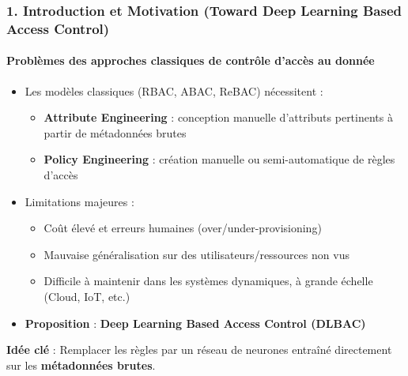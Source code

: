 \documentclass{beamer}
\begin{document}
\begin{frame}
\frametitle{1. Introduction et Motivation (Toward Deep Learning Based Access Control)}
\framesubtitle{Problèmes des approches classiques de contrôle d’accès au donnée}

\begin{itemize}
    \item Les modèles classiques (RBAC, ABAC, ReBAC) nécessitent :
    \begin{itemize}
        \item \textbf{Attribute Engineering} : conception manuelle d'attributs pertinents à partir de métadonnées brutes
        \item \textbf{Policy Engineering} : création manuelle ou semi-automatique de règles d'accès
    \end{itemize}
    \item Limitations majeures :
    \begin{itemize}
        \item Coût élevé et erreurs humaines (over/under-provisioning)
        \item Mauvaise généralisation sur des utilisateurs/ressources non vus
        \item Difficile à maintenir dans les systèmes dynamiques, à grande échelle (Cloud, IoT, etc.)
    \end{itemize}
    \item \textbf{Proposition} : \textbf{Deep Learning Based Access Control (DLBAC)}
\end{itemize}

\begin{center}
\textbf{Idée clé} : Remplacer les règles par un réseau de neurones entraîné directement sur les \textbf{métadonnées brutes}.
\end{center}

\end{frame}
\end{document}

